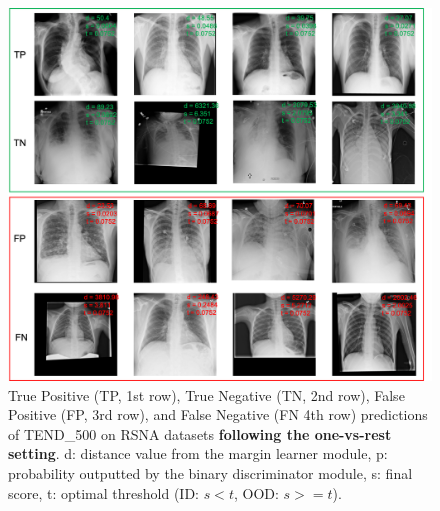 \documentclass[12pt]{spieman}  %
\begin{document}
\begin{spacing}{2}
\begin{figure}[htp]
\label{fig:rsna}
\end{figure}    
\begin{figure}[htp]
\begin{center}
  \includegraphics[width=\linewidth]{fig4.png}
\end{center}
  \caption{True Positive (TP, 1st row), True Negative (TN, 2nd row), False Positive (FP, 3rd row), and False Negative (FN 4th row) predictions of TEND\_500 on RSNA datasets \textbf{following the one-vs-rest setting}. d: distance value from the margin learner module, p: probability outputted by the binary discriminator module, s: final score, t: optimal threshold (ID: $s<t$, OOD: $s>=t$).} 
\label{fig:rsna_cases}
\end{figure}


\end{spacing}
\end{document}
